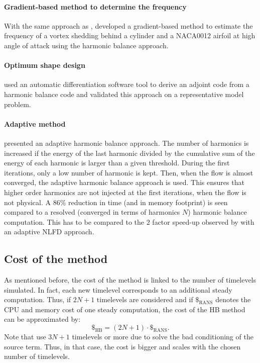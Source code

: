 \paragraph{Gradient-based method to determine the frequency}
With the same approach as \citet{McMullen2002}, \citet{Gopinath2006}
developed a gradient-based method to estimate the frequency of a 
vortex shedding behind a cylinder and a NACA0012 airfoil 
at high angle of attack using the harmonic balance approach.

\paragraph{Optimum shape design}
\citet{Thomas2005b} used an automatic 
differentiation software tool to derive an adjoint code
from a harmonic balance code and validated this approach
on a representative model problem.

\paragraph{Adaptive method}
\citet{Maple2004} presented an adaptive harmonic
balance approach. The number of harmonics is increased
if the energy of the last harmonic divided by the cumulative
sum of the energy of each harmonic is larger than a 
given threshold. During the first iterations, only
a low number of harmonic is kept. Then, when the flow
is almost converged, the adaptive harmonic balance
approach is used. This ensures that higher order harmonics
are not injected at the first iterations, when the
flow is not physical. A $86\%$ reduction in time (and
in memory footprint) is seen compared to a resolved (converged in
terms of harmonics $N$) harmonic
balance computation. This has to be compared to
the $2$ factor speed-up observed by \citet{Mosahebi2013}
with an adaptive NLFD approach.

\subsection{Cost of the method}
As mentioned before, the cost of the method is linked to
the number of timelevels simulated.
In fact, each new timelevel corresponds to an additional steady computation.
Thus, if $2N+1$ timelevels are considered and if $\mathdollar_{\text{RANS}}$ 
denotes the CPU and memory cost of
one steady computation, the cost of the HB method can be 
approximated by:
\begin{equation}
	\mathdollar_{\text{HB}} = (2N+1) \cdot \mathdollar_{\text{RANS}}.
\end{equation}
Note that \citet{Ekici2007,Ekici2008a} use $3N+1$
timelevels or more due to solve the bad conditioning of the
source term. Thus, in that
case, the cost is bigger and scales with the chosen number
of timelevels.